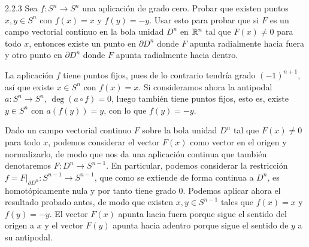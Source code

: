 \documentclass[twoside]{article}
\begin{document}
\newpage

\begin{ejercicio}{2.2.3}
Sea $f:S^n\to S^n$ una aplicación de grado cero. Probar que existen puntos $x,y\in S^n$ con $f(x)=x$ y $f(y)=-y$. Usar esto para probar que si $F$ es un campo vectorial continuo en la bola unidad $D^n$ en $\mathbb{R}^n$ tal que $F(x)\neq 0$ para todo $x$, entonces existe un punto en $\partial D^n$ donde $F$ apunta radialmente hacia fuera y otro punto en $\partial D^n$ donde $F$ apunta radialmente hacia dentro.
\end{ejercicio}
\begin{solucion}
La aplicación $f$ tiene puntos fijos, pues de lo contrario tendría grado $(-1)^{n+1}$, así que existe $x\in S^n$ con $f(x)=x$. Si consideramos ahora la antipodal $a:S^n\to S^n$, $\deg(a\circ f)=0$, luego también tiene puntos fijos, esto es, existe $y\in S^n$ con $a(f(y))=y$, con lo que $f(y)=-y$. 

Dado un campo vectorial continuo $F$ sobre la bola unidad $D^n$ tal que $F(x)\neq 0$ para todo $x$, podemos considerar el vector $F(x)$ como vector en el origen y normalizarlo, de modo que nos da una aplicación continua que también denotaremos $F:D^n\to S^{n-1}$. En particular, podemos considerar la restricción $f=F|_{\partial D^n}:S^{n-1}\to S^{n-1}$, que como se extiende de forma continua a $D^n$, es homotópicamente nula y por tanto tiene grado 0. Podemos aplicar ahora el resultado probado antes, de modo que existen $x,y\in S^{n-1}$ tales que $f(x)=x$ y $f(y)=-y$. El vector $F(x)$ apunta hacia fuera porque sigue el sentido del origen a $x$ y el vector $F(y)$ apunta hacia adentro porque sigue el sentido de $y$ a su antipodal.
\end{solucion}

\newpage
\end{document}
